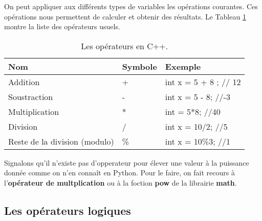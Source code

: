 \documentclass[a4paper, oneside,11pt]{book}
\begin{document}
On peut appliquer aux diff\'erents types de variables les op\'erations courantes. Ces op\'erations nous permettent de
calculer et obtenir des r\'esultats. Le Tableau \ref{tab_op} montre la liste des op\'erateurs usuels.


\begin{table}[hhhh]
\begin{center}
\begin{tabular}{lll}
\hline
\textbf{Nom} &\textbf{Symbole}&\textbf{Exemple}\\
\hline
Addition & + &int x = 5 + 8 ; // 12\\
Soustraction & - & int x = 5 - 8; //-3\\
Multiplication& * & int = 5*8; //40\\
Division & / & int x  = 10/2; //5\\

Reste de la division (modulo) &\% &int x = 10\%3; //1\\
\hline
\end{tabular}
\vspace{-0.25cm}
\caption{Les op\'erateurs en C++.}\label{tab_op}
\end{center}
\end{table}


Signalons qu'il n'existe pas d'opperateur pour \'elever une valeur \`a la puissance donn\'ee comme on n'en conna\^it en Python. Pour le faire, on 
fait recours \`a
 l'\textbf{op\'erateur de multplication} ou \`a la foction \textbf{pow} de 
 la librairie \textbf{math}.
\subsection{Les op\'erateurs logiques}
\end{document}

